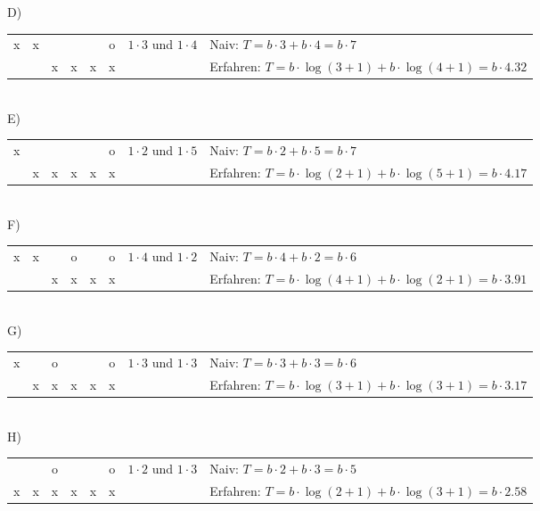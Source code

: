 \documentclass[a4paper,10pt]{article}
\begin{document}
D)\\
\begin{tabular}{|c|c|c|c|c|c|l|l}
\cline{1-6} x & x &   &   &   & o & $1\cdot 3$ und $1\cdot 4$ & Naiv: $T = b\cdot 3+b\cdot 4 = b\cdot 7$ \\
\cline{1-6}   &   & x & x & x & x &   & Erfahren: $T = b\cdot \log(3+1)+b\cdot \log(4+1) = b\cdot 4.32$ \\
\cline{1-6}
\end{tabular} \\

E)\\
\begin{tabular}{|c|c|c|c|c|c|l|l}
\cline{1-6} x &   &   &   &   & o & $1\cdot 2$ und $1\cdot 5$ & Naiv: $T = b\cdot 2+b\cdot 5 = b\cdot 7$ \\
\cline{1-6}   & x & x & x & x & x &   & Erfahren: $T = b\cdot \log(2+1)+b\cdot \log(5+1) = b\cdot 4.17$ \\
\cline{1-6}
\end{tabular} \\

F)\\
\begin{tabular}{|c|c|c|c|c|c|l|l}
\cline{1-6} x & x &   & o &   & o & $1\cdot 4$ und $1\cdot 2$ & Naiv: $T = b\cdot 4+b\cdot 2 = b\cdot 6$ \\
\cline{1-6}   &   & x & x & x & x &   & Erfahren: $T = b\cdot \log(4+1)+b\cdot \log(2+1) = b\cdot 3.91$ \\
\cline{1-6}
\end{tabular} \\

G)\\
\begin{tabular}{|c|c|c|c|c|c|l|l}
\cline{1-6} x &   & o &   &   & o & $1\cdot 3$ und $1\cdot 3$ & Naiv: $T = b\cdot 3+b\cdot 3 = b\cdot 6$ \\
\cline{1-6}   & x & x & x & x & x &   & Erfahren: $T = b\cdot \log(3+1)+b\cdot \log(3+1) = b\cdot 3.17$ \\
\cline{1-6}
\end{tabular} \\

H)\\
\begin{tabular}{|c|c|c|c|c|c|l|l}
\cline{1-6}   &   & o &   &   & o & $1\cdot 2$ und $1\cdot 3$ & Naiv: $T = b\cdot 2+b\cdot 3 = b\cdot 5$ \\
\cline{1-6} x & x & x & x & x & x &   & Erfahren: $T = b\cdot \log(2+1)+b\cdot \log(3+1) = b\cdot 2.58$ \\
\cline{1-6}
\end{tabular} \\
\end{document}
